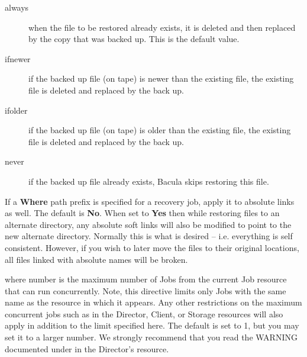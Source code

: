 \begin{description}
\begin{description}

\item [always]
  when the file to be restored already exists, it is deleted and then
  replaced by the copy that was backed up.  This is the default value.

\item [ifnewer]
  if the backed up file (on tape) is newer than the existing file, the
  existing file is deleted and replaced by the back up.

\item [ifolder]
  if the backed up file (on tape) is older than the existing file, the
  existing file is deleted and replaced by the back up.

\item [never]
  if the backed up file already exists, Bacula skips  restoring this file.  
\end{description}

\item [Prefix Links=\lt{}yes\vb{}no\gt{}]
   If a {\bf Where} path prefix is specified for a recovery job, apply it
   to absolute links as well.  The default is {\bf No}.  When set to {\bf
   Yes} then while restoring files to an alternate directory, any absolute
   soft links will also be modified to point to the new alternate
   directory.  Normally this is what is desired -- i.e.  everything is self
   consistent.  However, if you wish to later move the files to their
   original locations, all files linked with absolute names will be broken.

\item [Maximum Concurrent Jobs = \lt{}number\gt{}]
   where \lt{}number\gt{} is the maximum number of Jobs from the current
   Job resource that can run concurrently.  Note, this directive limits
   only Jobs with the same name as the resource in which it appears.  Any
   other restrictions on the maximum concurrent jobs such as in the
   Director, Client, or Storage resources will also apply in addition to
   the limit specified here.  The default is set to 1, but you may set it
   to a larger number.  We strongly recommend that you read the WARNING
   documented under  in the
   Director's resource.


\end{description}
